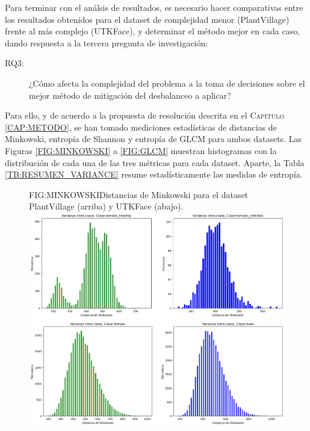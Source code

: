 
Para terminar con el análsis de resultados, es necesario hacer comparativas entre los resultados obtenidos para el dataset de complejidad menor (PlantVillage) frente al más complejo (UTKFace), y determinar el método mejor en cada caso, dando respuesta a la tercera pregunta de investigación:

\begin{description}    
    \item[RQ3:] ¿Cómo afecta la complejidad del problema a la toma de decisiones sobre el mejor método de mitigación del desbalanceo a aplicar?
\end{description}

Para ello, y de acuerdo a la propuesta de resolución descrita en el \textsc{Capítulo \ref{CAP:METODO}}, se han tomado mediciones estadísticas de distancias de Minkowski, entropía de Shannon y entropía de GLCM para ambos datasets. Las Figuras \ref{FIG:MINKOWSKI} a \ref{FIG:GLCM} muestran histogramas con la distribución de cada una de las tres métricas para cada dataset. Aparte, la Tabla \ref{TB:RESUMEN_VARIANCE} resume estadísticamente las medidas de entropía.

\begin{figure}[Histogramas de distancias de Minkowski]{FIG:MINKOWSKI}{Distancias de Minkowski para el dataset PlantVillage (arriba) y UTKFace (abajo).}
    \centering
    \includegraphics[width=12cm]{img/icv/minkowski_PV.png}
    \includegraphics[width=12cm]{img/icv/minkowski_UTK.png}
\end{figure}


